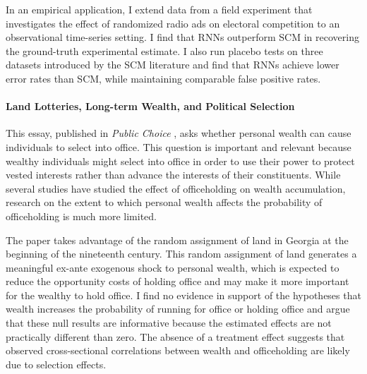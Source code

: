 In an empirical application, I extend data from a field experiment that investigates the effect of randomized radio ads on electoral competition to an observational time-series setting. I find that RNNs outperform SCM in recovering the ground-truth experimental estimate. I also run placebo tests on three datasets introduced by the SCM literature and find that RNNs achieve lower error rates than SCM, while maintaining comparable false positive rates.


\paragraph*{Land Lotteries, Long-term Wealth, and Political Selection} 
This essay, published in \emph{Public Choice} \citep{poulos2019land}, asks whether personal wealth can cause individuals to select into office. This question is important and relevant because wealthy individuals might select into office in order to use their power to protect vested interests rather than advance the interests of their constituents. While several studies have studied the effect of officeholding on wealth accumulation, research on the extent to which personal wealth affects the probability of officeholding is much more limited.

The paper takes advantage of the random assignment of land in Georgia at the beginning of the nineteenth century. This random assignment of land generates a meaningful ex-ante exogenous shock to personal wealth, which is expected to reduce the opportunity costs of holding office and may make it more important for the wealthy to hold office. I find no evidence in support of the hypotheses that wealth increases the probability of running for office or holding office and argue that these null results are informative because the estimated effects are not practically different than zero. The absence of a treatment effect suggests that observed cross-sectional correlations between wealth and officeholding are likely due to selection effects. 
